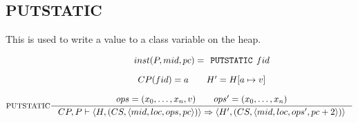 \subsection{PUTSTATIC}
This is used to write a value to a class variable on the heap.

$$\inference[PUTSTATIC]{
inst(P,mid, pc) = \texttt{PUTSTATIC } fid \semnl \\
CP(fid) = a\semsp
H' = H[a\mapsto v] \semnl \\
ops = (x_0, \ldots, x_n, v) \semsp 
ops' = (x_0, \ldots, x_{n})
}
{CP, P \vdash \langle H, (CS, \langle mid, loc, ops, pc \rangle )\rangle \Rightarrow \langle H', (CS, \langle mid, loc, ops', pc + 2 \rangle )\rangle}$$
